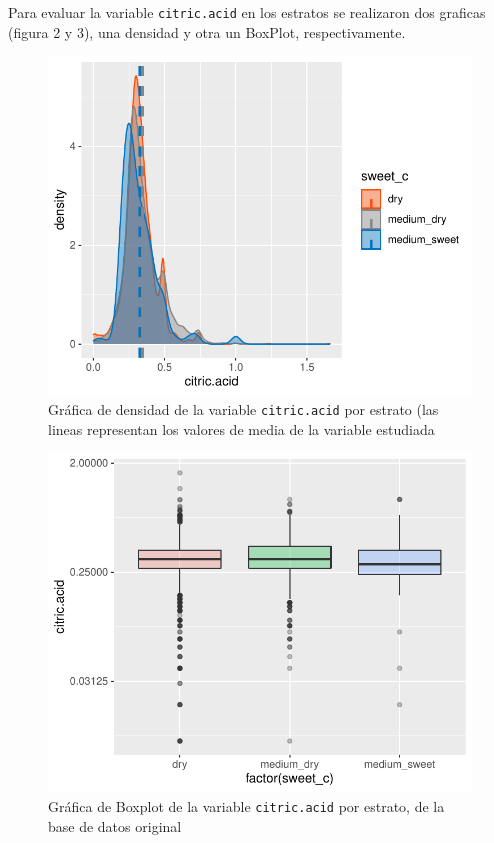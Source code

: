 \documentclass[
]{article}
\begin{document}
Para evaluar la variable \texttt{citric.acid} en los estratos se
realizaron dos graficas (figura 2 y 3), una densidad y otra un BoxPlot,
respectivamente.

\begin{figure}
\centering
\includegraphics{muestreo_estratificado_final_files/figure-latex/desity_plot untidy-1.pdf}
\caption{Gráfica de densidad de la variable \texttt{citric.acid} por
estrato (las lineas representan los valores de media de la variable
estudiada}
\end{figure}

\begin{figure}
\centering
\includegraphics{muestreo_estratificado_final_files/figure-latex/Boxplot untidy-1.pdf}
\caption{Gráfica de Boxplot de la variable \texttt{citric.acid} por
estrato, de la base de datos original}
\end{figure}
\end{document}
